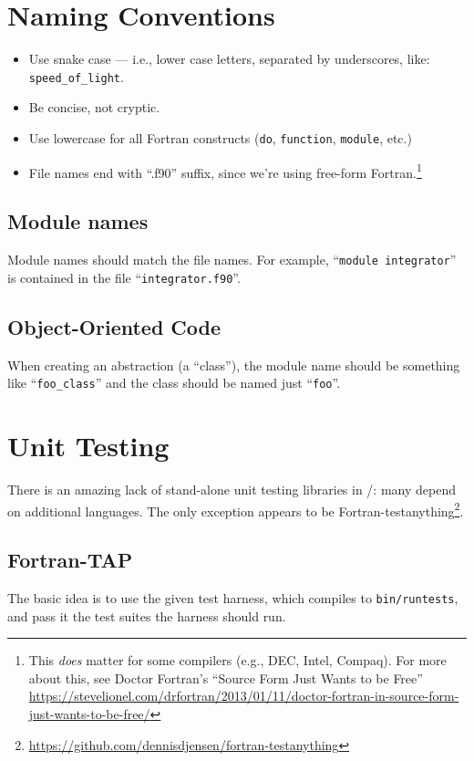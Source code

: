 \section{Naming Conventions}

\begin{itemize}
\item Use snake case --- i.e., lower case letters, separated by
  underscores, like: \verb|speed_of_light|.
\item Be concise, not cryptic.
\item Use lowercase for all Fortran constructs ({\tt do}, {\tt function},
  {\tt module}, etc.)
\item File names end with ``.f90'' suffix, since we're using free-form
  Fortran.\footnote{This \emph{does} matter for some compilers (e.g., DEC,
  Intel, Compaq). For more about this, see Doctor Fortran's ``Source
  Form Just Wants to be Free'' \url{https://stevelionel.com/drfortran/2013/01/11/doctor-fortran-in-source-form-just-wants-to-be-free/}}
\end{itemize}

\subsection{Module names}
Module names should match the file names. For example, ``{\tt module integrator}''
is contained in the file ``{\tt integrator.f90}''.

\subsection{Object-Oriented Code}
When creating an abstraction (a ``class''), the module name should be
something like ``\verb#foo_class#'' and the class should be named just
``\verb#foo#''.

\section{Unit Testing}

There is an amazing lack of stand-alone unit testing libraries in
\FORTRAN/: many depend on additional languages. The only exception
appears to be Fortran-testanything\footnote{\url{https://github.com/dennisdjensen/fortran-testanything}}.

\subsection{Fortran-TAP}
The basic idea is to use the given test harness, which compiles to
\verb|bin/runtests|, and pass it the test suites the harness should run.

